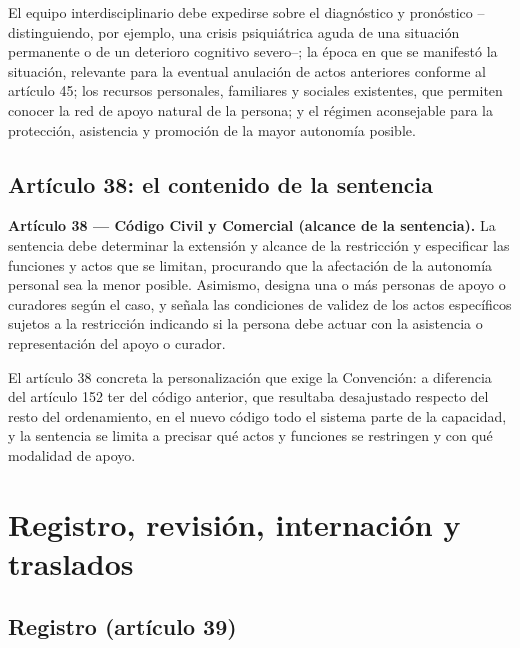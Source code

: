 \documentclass[12pt,oneside]{book}
\begin{document}

El equipo interdisciplinario debe expedirse sobre el diagnóstico y pronóstico --distinguiendo, por ejemplo, una crisis psiquiátrica aguda de una situación permanente o de un deterioro cognitivo severo--; la época en que se manifestó la situación, relevante para la eventual anulación de actos anteriores conforme al artículo 45; los recursos personales, familiares y sociales existentes, que permiten conocer la red de apoyo natural de la persona; y el régimen aconsejable para la protección, asistencia y promoción de la mayor autonomía posible.

\subsection{Artículo 38: el contenido de la sentencia}

\begin{important}
\textbf{Artículo 38 --- Código Civil y Comercial (alcance de la sentencia).} La sentencia debe determinar la extensión y alcance de la restricción y especificar las funciones y actos que se limitan, procurando que la afectación de la autonomía personal sea la menor posible. Asimismo, designa una o más personas de apoyo o curadores según el caso, y señala las condiciones de validez de los actos específicos sujetos a la restricción indicando si la persona debe actuar con la asistencia o representación del apoyo o curador.
\end{important}

El artículo 38 concreta la personalización que exige la Convención: a diferencia del artículo 152 ter del código anterior, que resultaba desajustado respecto del resto del ordenamiento, en el nuevo código todo el sistema parte de la capacidad, y la sentencia se limita a precisar qué actos y funciones se restringen y con qué modalidad de apoyo.

\section{Registro, revisión, internación y traslados}

\subsection{Registro (artículo 39)}
\end{document}
